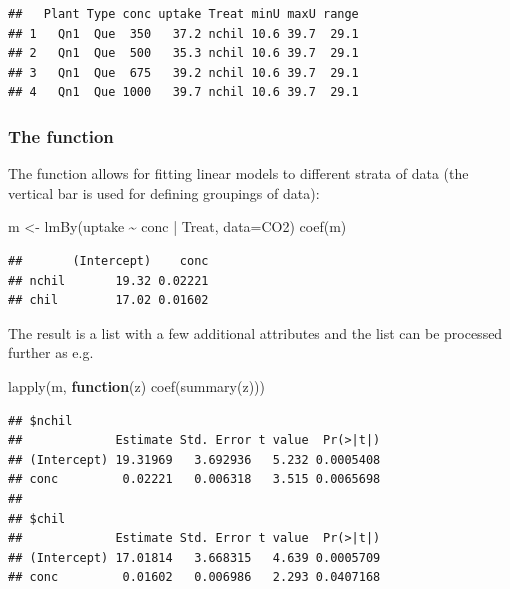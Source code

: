 \documentclass[
]{article}
\newenvironment{Shaded}{\begin{snugshade}}{\end{snugshade}}
\newcommand{\AttributeTok}[1]{\textcolor[rgb]{0.77,0.63,0.00}{#1}}
\newcommand{\ControlFlowTok}[1]{\textcolor[rgb]{0.13,0.29,0.53}{\textbf{#1}}}
\newcommand{\FunctionTok}[1]{\textcolor[rgb]{0.00,0.00,0.00}{#1}}
\newcommand{\NormalTok}[1]{#1}
\newcommand{\OtherTok}[1]{\textcolor[rgb]{0.56,0.35,0.01}{#1}}
\newcommand{\SpecialCharTok}[1]{\textcolor[rgb]{0.00,0.00,0.00}{#1}}
\begin{document}
\begin{verbatim}
##   Plant Type conc uptake Treat minU maxU range
## 1   Qn1  Que  350   37.2 nchil 10.6 39.7  29.1
## 2   Qn1  Que  500   35.3 nchil 10.6 39.7  29.1
## 3   Qn1  Que  675   39.2 nchil 10.6 39.7  29.1
## 4   Qn1  Que 1000   39.7 nchil 10.6 39.7  29.1
\end{verbatim}

\hypertarget{the-function-5}{%
\subsubsection{\texorpdfstring{The 
function}{The  function}}\label{the-function-5}}

The  function allows for fitting linear models to different
strata of data (the vertical bar is used for defining groupings of
data):

\begin{Shaded}
\begin{Highlighting}[]
\NormalTok{m }\OtherTok{\textless{}{-}} \FunctionTok{lmBy}\NormalTok{(uptake }\SpecialCharTok{\textasciitilde{}}\NormalTok{ conc }\SpecialCharTok{|}\NormalTok{ Treat, }\AttributeTok{data=}\NormalTok{CO2)}
\FunctionTok{coef}\NormalTok{(m)}
\end{Highlighting}
\end{Shaded}

\begin{verbatim}
##       (Intercept)    conc
## nchil       19.32 0.02221
## chil        17.02 0.01602
\end{verbatim}

The result is a list with a few additional attributes and the list can
be processed further as e.g.

\begin{Shaded}
\begin{Highlighting}[]
\FunctionTok{lapply}\NormalTok{(m, }\ControlFlowTok{function}\NormalTok{(z) }\FunctionTok{coef}\NormalTok{(}\FunctionTok{summary}\NormalTok{(z)))}
\end{Highlighting}
\end{Shaded}

\begin{verbatim}
## $nchil
##             Estimate Std. Error t value  Pr(>|t|)
## (Intercept) 19.31969   3.692936   5.232 0.0005408
## conc         0.02221   0.006318   3.515 0.0065698
## 
## $chil
##             Estimate Std. Error t value  Pr(>|t|)
## (Intercept) 17.01814   3.668315   4.639 0.0005709
## conc         0.01602   0.006986   2.293 0.0407168
\end{verbatim}
\end{document}
